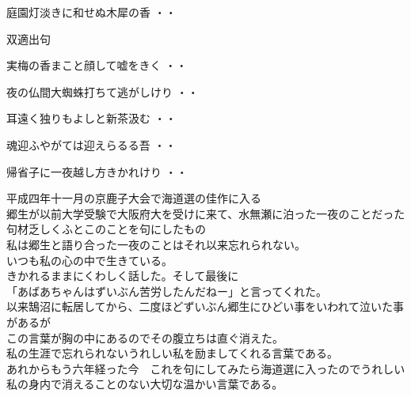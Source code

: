 \begin{shiika}庭園灯淡きに和せぬ木犀の香
\hfill{・・}\end{shiika}
\vspace{0.6cm}
双適出句
\begin{shiika}実梅の香まこと顔して嘘をきく
\hfill{・・}\end{shiika}
\begin{shiika}夜の仏間大蜘蛛打ちて逃がしけり
\hfill{・・}\end{shiika}
\begin{shiika}耳遠く独りもよしと新茶汲む
\hfill{・・}\end{shiika}
\begin{shiika}魂迎ふやがては迎えらるる吾
\hfill{・・}\end{shiika}
\begin{shiika}帰省子に一夜越し方きかれけり
\hfill{・・}\end{shiika}
\qquad\qquad\qquad 平成四年十一月の京鹿子大会で海道選の佳作に入る\\
\qquad\qquad\qquad 郷生が以前大学受験で大阪府大を受けに来て、水無瀬に泊った一夜のことだった\\
\qquad\qquad\qquad 句材乏しくふとこのことを句にしたもの\\
\qquad\qquad\qquad 私は郷生と語り合った一夜のことはそれ以来忘れられない。\\
\qquad\qquad\qquad いつも私の心の中で生きている。\\
\qquad\qquad\qquad きかれるままにくわしく話した。そして最後に\\
\qquad\qquad\qquad「あばあちゃんはずいぶん苦労したんだねー」と言ってくれた。\\
\qquad\qquad\qquad 以来鵠沼に転居してから、二度ほどずいぶん郷生にひどい事をいわれて泣いた事があるが\\
\qquad\qquad\qquad この言葉が胸の中にあるのでその腹立ちは直ぐ消えた。\\
\qquad\qquad\qquad 私の生涯で忘れられないうれしい私を励ましてくれる言葉である。\\
\qquad\qquad\qquad あれからもう六年経った今　これを句にしてみたら海道選に入ったのでうれしい\\
\qquad\qquad\qquad 私の身内で消えることのない大切な温かい言葉である。\\

